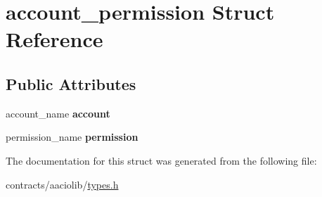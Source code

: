 \hypertarget{structaccount__permission}{}\section{account\+\_\+permission Struct Reference}
\label{structaccount__permission}
\subsection*{Public Attributes}
\begin{DoxyCompactItemize}
\item 
\mbox{\label{structaccount__permission_ad27c2a755c671a1fed5a5f36400597a7}} 
account\+\_\+name {\bfseries account}
\item 
\mbox{\label{structaccount__permission_a325949ab97fd287558359b7314d22088}} 
permission\+\_\+name {\bfseries permission}
\end{DoxyCompactItemize}


The documentation for this struct was generated from the following file\+:\begin{DoxyCompactItemize}
\item 
contracts/aaciolib/\mbox{\hyperlink{contracts_2aaciolib_2types_8h}{types.\+h}}\end{DoxyCompactItemize}
